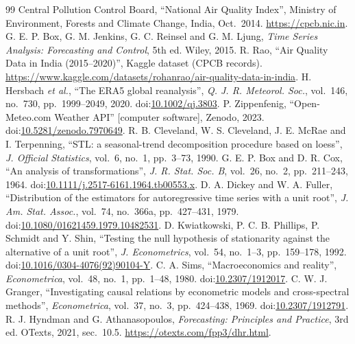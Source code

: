 \documentclass[11pt,a4paper,twoside,twocolumn]{extarticle}
\begin{document}
\renewcommand{\refname}{References}
\begingroup\footnotesize
\begin{thebibliography}{99}\setlength{\itemsep}{0pt}
 Central Pollution Control Board, ``National Air Quality Index'', Ministry of Environment, Forests and Climate Change, India, Oct.\ 2014. \url{https://cpcb.nic.in}.
 G. E. P. Box, G. M. Jenkins, G. C. Reinsel and G. M. Ljung, \emph{Time Series Analysis: Forecasting and Control}, 5th ed. Wiley, 2015.
 R. Rao, ``Air Quality Data in India (2015--2020)'', Kaggle dataset (CPCB records). \url{https://www.kaggle.com/datasets/rohanrao/air-quality-data-in-india}.
 H. Hersbach \emph{et al.}, ``The ERA5 global reanalysis'', \emph{Q. J. R. Meteorol. Soc.}, vol.~146, no.~730, pp.~1999--2049, 2020. doi:\href{https://doi.org/10.1002/qj.3803}{10.1002/qj.3803}.
 P. Zippenfenig, ``Open-Meteo.com Weather API'' [computer software], Zenodo, 2023. doi:\href{https://doi.org/10.5281/zenodo.7970649}{10.5281/zenodo.7970649}.
 R. B. Cleveland, W. S. Cleveland, J. E. McRae and I. Terpenning, ``STL: a seasonal-trend decomposition procedure based on loess'', \emph{J. Official Statistics}, vol.~6, no.~1, pp.~3--73, 1990.
 G. E. P. Box and D. R. Cox, ``An analysis of transformations'', \emph{J. R. Stat. Soc. B}, vol.~26, no.~2, pp.~211--243, 1964. doi:\href{https://doi.org/10.1111/j.2517-6161.1964.tb00553.x}{10.1111/j.2517-6161.1964.tb00553.x}.
 D. A. Dickey and W. A. Fuller, ``Distribution of the estimators for autoregressive time series with a unit root'', \emph{J. Am. Stat. Assoc.}, vol.~74, no.~366a, pp.~427--431, 1979. doi:\href{https://doi.org/10.1080/01621459.1979.10482531}{10.1080/01621459.1979.10482531}.
 D. Kwiatkowski, P. C. B. Phillips, P. Schmidt and Y. Shin, ``Testing the null hypothesis of stationarity against the alternative of a unit root'', \emph{J. Econometrics}, vol.~54, no.~1--3, pp.~159--178, 1992. doi:\href{https://doi.org/10.1016/0304-4076(92)90104-Y}{10.1016/0304-4076(92)90104-Y}.
 C. A. Sims, ``Macroeconomics and reality'', \emph{Econometrica}, vol.~48, no.~1, pp.~1--48, 1980. doi:\href{https://doi.org/10.2307/1912017}{10.2307/1912017}.
 C. W. J. Granger, ``Investigating causal relations by econometric models and cross-spectral methods'', \emph{Econometrica}, vol.~37, no.~3, pp.~424--438, 1969. doi:\href{https://doi.org/10.2307/1912791}{10.2307/1912791}.
 R. J. Hyndman and G. Athanasopoulos, \emph{Forecasting: Principles and Practice}, 3rd ed. OTexts, 2021, sec.~10.5. \url{https://otexts.com/fpp3/dhr.html}.

\end{thebibliography}
\end{document}
